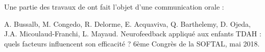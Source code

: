 Une partie des travaux de \citet{Bussalb2019clinical} ont fait l'objet d'une communication orale :

\noindent A. Bussalb, M. Congedo, R. Delorme, E. Acquaviva, Q. Barthelemy, D. Ojeda, J.A. Micoulaud-Franchi, L. Mayaud. Neurofeedback 
appliqué aux enfants TDAH : quels facteurs influencent son efficacité ? 6ème Congrès de la SOFTAL, mai 2018. 


